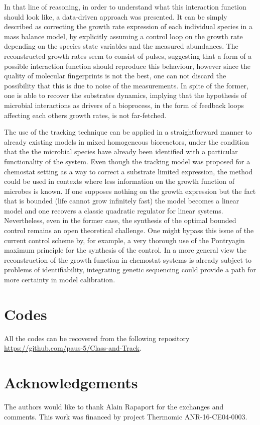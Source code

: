 \documentclass[3p,times]{article}
\begin{document}
In that line of reasoning, in order to understand what this interaction function should look like, a data-driven approach was presented. It can be simply described as correcting the growth rate expression of each individual species in a mass balance model, by explicitly assuming a control loop on the growth rate depending on the species state variables and the measured abundances. The reconstructed growth rates seem to consist of pulses, suggesting that a form of a possible interaction function should reproduce this behaviour, however since the quality of molecular fingerprints is not the best, one can not discard the possibility that this is due to noise of the measurements. In spite of the former, one is able to recover the substrates dynamics, implying that the hypothesis of microbial interactions as drivers of a bioprocess, in the form of feedback loops affecting each others growth rates, is not far-fetched. 

The use of the tracking technique can be applied in a straightforward manner to already existing models in mixed homogeneous bioreactors, under the condition that the the microbial species have already been identified with a particular functionality of the system. Even though the tracking model was proposed for a chemostat setting as a way to correct a substrate limited expression, the method could be used in contexts where less information on the growth function of microbes is known. If one supposes nothing on the growth expression but the fact that is bounded (life cannot grow infinitely fast) the model becomes a linear model and one recovers a classic quadratic regulator for linear systems. Nevertheless, even in the former case, the synthesis of the optimal bounded control remains an open theoretical challenge. One might bypass this issue of the current control scheme by, for example, a very thorough use of the Pontryagin maximum principle for the synthesis of the control. In a more general view the reconstruction of the growth function in chemostat systems is already subject to problems of identifiability\cite{Dochain2003}, integrating genetic sequencing could provide a path for more certainty in model calibration. 


\section{Codes}

All the codes can be recovered from the following repository \url{https://github.com/paus-5/Class-and-Track}.
\section{Acknowledgements}
 The authors would like to thank Alain Rapaport for the exchanges and comments. This work was financed by project Thermomic ANR-16-CE04-0003.
\end{document}
